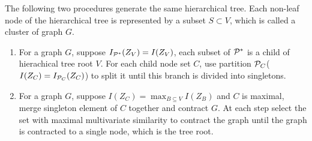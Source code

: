 \begin{proposition}\label{prop:ta}
The following two procedures generate the same hierarchical tree. Each non-leaf node of the hierarchical tree is represented by a subset $S \subset V$, which is called a cluster of graph $G$.
\begin{enumerate}
\item For a graph $G$, suppose $I_{\P^*}(Z_V)=I(Z_V)$, each subset of $\P^*$ is a child of hierachical tree root $V$. For each child node set $C$, use partition $\P_C$($I(Z_C)=I_{\P_C}(Z_C)$) to split it until this branch is divided into singletons.
\item For a graph $G$, suppose $I(Z_C) = \max_{B\subseteq V} I(Z_B)$ and $C$ is maximal, merge singleton element of $C$ together and contract $G$. At each step select the set with maximal multivariate similarity to contract the graph until the graph is contracted to a single node, which is the tree root.
\end{enumerate}
\end{proposition}
